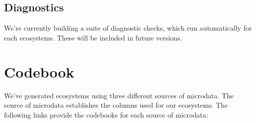 \documentclass{article}
\begin{document}


\subsection{Diagnostics}
	We're currently building a suite of diagnostic checks, which run automatically for each ecosystems. These will be included in future versions.

\newpage
\nocite{*}
\printbibliography

\newpage 
\appendix

\section{Codebook}
We've generated ecosystems using three different sources of microdata. The source of microdata establishes the columns used for our ecosystems. The following links provide the codebooks for each source of microdata:
\end{document}
